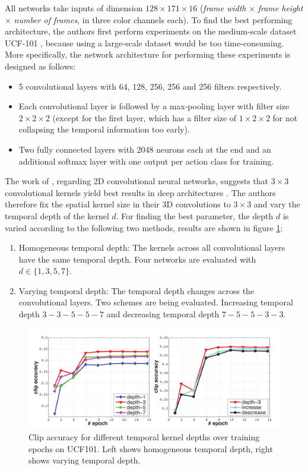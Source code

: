 All networks take inputs of dimension $128\times171\times16$ (\textit{frame width} $\times$ \textit{frame height} $\times$ \textit{number of frames}, in three color channels each).
To find the best performing architecture, the authors first perform experiments on the medium-scale dataset UCF-101 \cite{soomro_ucf101:_2012}, because using a large-scale dataset would be too time-consuming.
More specifically, the network architecture for performing these experiments is designed as follows:
\begin{itemize}
    \item 5 convolutional layers with 64, 128, 256, 256 and 256 filters respectively.
    \item Each convolutional layer is followed by a max-pooling layer with filter size $2\times2\times2$ (except for the first layer, which has a filter size of $1\times2\times2$ for not collapsing the temporal information too early).
    \item Two fully connected layers with 2048 neurons each at the end and an additional softmax layer with one output per action class for training.
\end{itemize}

The work of \textcite{simonyan_very_2014}, regarding 2D convolutional neural networks, suggests that $3\times3$ convolutional kernels yield best results in deep architectures .
The authors therefore fix the spatial kernel size in their 3D convolutions to $3\times3$ and vary the temporal depth of the kernel $d$.
For finding the best parameter, the depth $d$ is varied according to the following two methods, results are shown in figure \ref{fig:c3d_temporaldeptheval}:
\begin{enumerate}
    \item Homogeneous temporal depth: The kernels across all convolutional layers have the same temporal depth. Four networks are evaluated with $d \in \{1, 3, 5, 7\}$.
    \item Varying temporal depth: The temporal depth changes across the convolutional layers. Two schemes are being evaluated. Increasing temporal depth $3-3-5-5-7$ and decreasing temporal depth $7-5-5-3-3$.
\end{enumerate}

\begin{figure}[H]
    \centering
    \includegraphics[width=\textwidth]{img_deep/c3d_temporaldeptheval}
    \caption{Clip accuracy for different temporal kernel depths over training epochs on UCF101. Left shows homogeneous temporal depth, right shows varying temporal depth. \cite{tran_learning_2015}}
    \label{fig:c3d_temporaldeptheval}
\end{figure}

